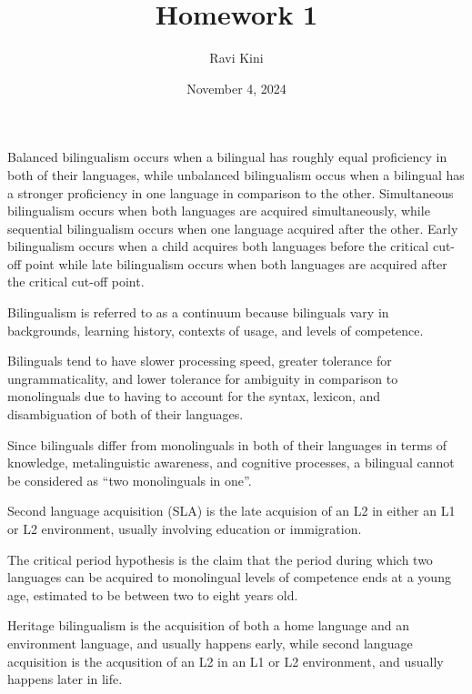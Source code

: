 \documentclass{article}
\title{Homework 1}
\author{Ravi Kini}
\date{November 4, 2024}
\begin{document}
\maketitle

\problem
{}
Balanced bilingualism occurs when a bilingual has roughly equal proficiency in both of their languages, while unbalanced bilingualism occus when a bilingual has a stronger proficiency in one language in comparison to the other.
Simultaneous bilingualism occurs when both languages are acquired simultaneously, while sequential bilingualism occurs when one language acquired after the other.
Early bilingualism occurs when a child acquires both languages before the critical cut-off point while late bilingualism occurs when both languages are acquired after the critical cut-off point.

\clearpage

\problem
Bilingualism is referred to as a continuum because bilinguals vary in backgrounds, learning history, contexts of usage, and levels of competence.

\clearpage

\problem
Bilinguals tend to have slower processing speed, greater tolerance for ungrammaticality, and lower tolerance for ambiguity in comparison to monolinguals due to having to account for the syntax, lexicon, and disambiguation of both of their languages.

\clearpage

\problem
Since bilinguals differ from monolinguals in both of their languages in terms of knowledge, metalinguistic awareness, and cognitive processes, a bilingual cannot be considered as ``two monolinguals in one''.

\clearpage

\problem
Second language acquisition (SLA) is the late acquision of an L2 in either an L1 or L2 environment, usually involving education or immigration.

\clearpage

\problem
The critical period hypothesis is the claim that the period during which two languages can be acquired to monolingual levels of competence ends at a young age, estimated to be between two to eight years old.

\clearpage

\problem
Heritage bilingualism is the acquisition of both a home language and an environment language, and usually happens early, while second language acquisition is the acqusition of an L2 in an L1 or L2 environment, and usually happens later in life.
\end{document}
